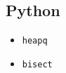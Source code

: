 \subsection{Python}%
\label{sub:standard-implementations--python}


{\color{red}
\begin{itemize}
    \item \texttt{heapq}
    \item \texttt{bisect}
\end{itemize}
}

